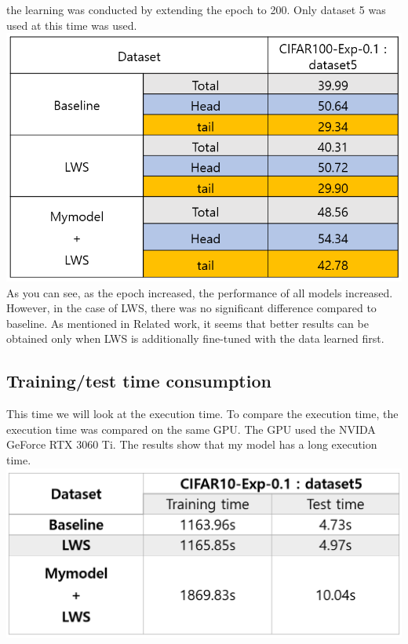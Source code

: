 \documentclass[extendedabs]{bmvc2k}
\begin{document}
  the learning was conducted by extending the epoch to 200. Only dataset 5 was used at this time was used.
  \newline \includegraphics[width=\linewidth]{images/14_project.PNG}
  As you can see, as the epoch increased, the performance of all models increased. However, in the case of LWS, there was no significant difference compared to baseline. 
  As mentioned in Related work, it seems that better results can be obtained only when LWS is additionally fine-tuned with the data learned first.
  \subsection{Training/test time consumption}
  \quad This time we will look at the execution time. To compare the execution time, the execution time was compared on the same GPU. 
  The GPU used the NVIDA GeForce RTX 3060 Ti. The results show that my model has a long execution time.
  \newline \includegraphics[width=\linewidth]{images/15_project.PNG}
\end{document}

